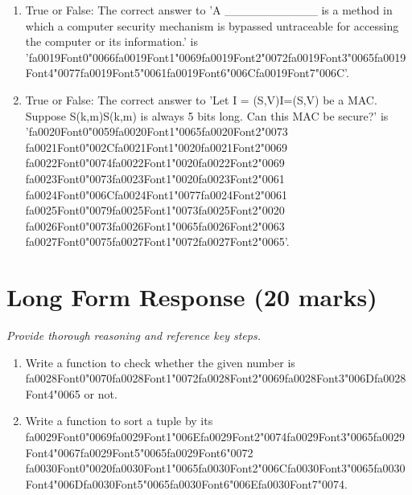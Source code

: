 \documentclass[12pt]{article}
\begin{document}
\begin{enumerate}[label=\arabic*.]
\item True or False: The correct answer to 'A \_\_\_\_\_\_\_\_\_\_\_ is a method in which a computer security mechanism is bypassed untraceable for accessing the computer or its information.' is '{\csname fa0019Font0\endcsname\char"0066}{\csname fa0019Font1\endcsname\char"0069}{\csname fa0019Font2\endcsname\char"0072}{\csname fa0019Font3\endcsname\char"0065}{\csname fa0019Font4\endcsname\char"0077}{\csname fa0019Font5\endcsname\char"0061}{\csname fa0019Font6\endcsname\char"006C}{\csname fa0019Font7\endcsname\char"006C}'.
\item True or False: The correct answer to 'Let I = (S,V)I=(S,V) be a MAC. Suppose S(k,m)S(k,m) is always 5 bits long. Can this MAC be secure?' is '{\csname fa0020Font0\endcsname\char"0059}{\csname fa0020Font1\endcsname\char"0065}{\csname fa0020Font2\endcsname\char"0073} {\csname fa0021Font0\endcsname\char"002C}{\csname fa0021Font1\endcsname\char"0020}{\csname fa0021Font2\endcsname\char"0069} {\csname fa0022Font0\endcsname\char"0074}{\csname fa0022Font1\endcsname\char"0020}{\csname fa0022Font2\endcsname\char"0069} {\csname fa0023Font0\endcsname\char"0073}{\csname fa0023Font1\endcsname\char"0020}{\csname fa0023Font2\endcsname\char"0061} {\csname fa0024Font0\endcsname\char"006C}{\csname fa0024Font1\endcsname\char"0077}{\csname fa0024Font2\endcsname\char"0061} {\csname fa0025Font0\endcsname\char"0079}{\csname fa0025Font1\endcsname\char"0073}{\csname fa0025Font2\endcsname\char"0020} {\csname fa0026Font0\endcsname\char"0073}{\csname fa0026Font1\endcsname\char"0065}{\csname fa0026Font2\endcsname\char"0063} {\csname fa0027Font0\endcsname\char"0075}{\csname fa0027Font1\endcsname\char"0072}{\csname fa0027Font2\endcsname\char"0065}'.
\end{enumerate}

\section*{Long Form Response (20 marks)}
\textit{Provide thorough reasoning and reference key steps.}
\begin{enumerate}[label=\arabic*.]
\item Write a function to check whether the given number is {\csname fa0028Font0\endcsname\char"0070}{\csname fa0028Font1\endcsname\char"0072}{\csname fa0028Font2\endcsname\char"0069}{\csname fa0028Font3\endcsname\char"006D}{\csname fa0028Font4\endcsname\char"0065} or not.
\item Write a function to sort a tuple by its {\csname fa0029Font0\endcsname\char"0069}{\csname fa0029Font1\endcsname\char"006E}{\csname fa0029Font2\endcsname\char"0074}{\csname fa0029Font3\endcsname\char"0065}{\csname fa0029Font4\endcsname\char"0067}{\csname fa0029Font5\endcsname\char"0065}{\csname fa0029Font6\endcsname\char"0072} {\csname fa0030Font0\endcsname\char"0020}{\csname fa0030Font1\endcsname\char"0065}{\csname fa0030Font2\endcsname\char"006C}{\csname fa0030Font3\endcsname\char"0065}{\csname fa0030Font4\endcsname\char"006D}{\csname fa0030Font5\endcsname\char"0065}{\csname fa0030Font6\endcsname\char"006E}{\csname fa0030Font7\endcsname\char"0074}.
\end{enumerate}
\end{document}
